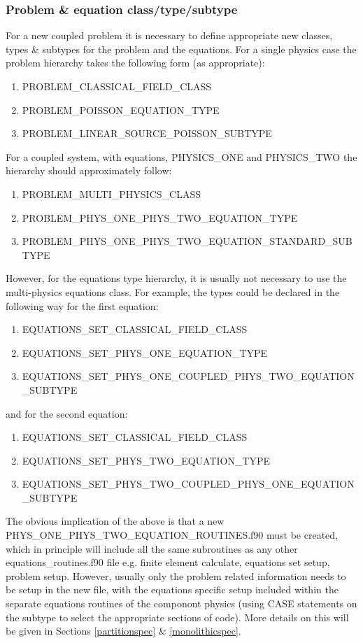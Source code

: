 \subsubsection{Problem \& equation class/type/subtype}

For a new coupled problem it is necessary to define appropriate new classes, types \& subtypes for the problem and the equations. For a single physics case the problem hierarchy takes the following form (as appropriate):
\begin{enumerate}
 \item PROBLEM\_CLASSICAL\_FIELD\_CLASS
 \item PROBLEM\_POISSON\_EQUATION\_TYPE
 \item PROBLEM\_LINEAR\_SOURCE\_POISSON\_SUBTYPE
\end{enumerate}
For a coupled system, with equations, PHYSICS\_ONE and PHYSICS\_TWO the hierarchy should approximately follow:
\begin{enumerate}
 \item PROBLEM\_MULTI\_PHYSICS\_CLASS
 \item PROBLEM\_PHYS\_ONE\_PHYS\_TWO\_EQUATION\_TYPE
 \item PROBLEM\_PHYS\_ONE\_PHYS\_TWO\_EQUATION\_STANDARD\_SUBTYPE
\end{enumerate}

However, for the equations type hierarchy, it is usually not necessary to use the multi-physics equations class. For example, the types could be declared in the following way for the first equation:
\begin{enumerate}
 \item EQUATIONS\_SET\_CLASSICAL\_FIELD\_CLASS
 \item EQUATIONS\_SET\_PHYS\_ONE\_EQUATION\_TYPE
 \item EQUATIONS\_SET\_PHYS\_ONE\_COUPLED\_PHYS\_TWO\_EQUATION\_SUBTYPE
\end{enumerate}
and for the second equation:
\begin{enumerate}
 \item EQUATIONS\_SET\_CLASSICAL\_FIELD\_CLASS
 \item EQUATIONS\_SET\_PHYS\_TWO\_EQUATION\_TYPE
 \item EQUATIONS\_SET\_PHYS\_TWO\_COUPLED\_PHYS\_ONE\_EQUATION\_SUBTYPE
\end{enumerate}

The obvious implication of the above is that a new PHYS\_ONE\_PHYS\_TWO\_EQUATION\_ROUTINES.f90 must be created, which in principle will include all the same subroutines as any other equations\_routines.f90 file e.g. finite element calculate, equations set setup, problem setup. However, usually only the problem related information needs to be setup in the new file, with the equations specific setup included within the separate equations routines of the componont physics (using CASE statements on the subtype to select the appropriate sections of code). More details on this will be given in Sections \ref{partitionspec} \& \ref{monolithicspec}.

